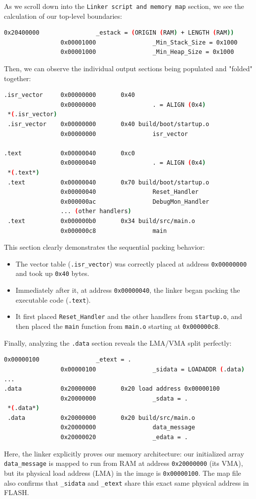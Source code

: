 As we scroll down into the \texttt{Linker script and memory map} section, we see the calculation of our top-level boundaries:
\begin{lstlisting}[language=bash]
                0x20400000                _estack = (ORIGIN (RAM) + LENGTH (RAM))
                0x00001000                _Min_Stack_Size = 0x1000
                0x00001000                _Min_Heap_Size = 0x1000
\end{lstlisting}

Then, we can observe the individual output sections being populated and "folded" together:

\begin{lstlisting}[language=bash]
.isr_vector     0x00000000       0x40
                0x00000000                . = ALIGN (0x4)
 *(.isr_vector)
 .isr_vector    0x00000000       0x40 build/boot/startup.o
                0x00000000                isr_vector

.text           0x00000040       0xc0
                0x00000040                . = ALIGN (0x4)
 *(.text*)
 .text          0x00000040       0x70 build/boot/startup.o
                0x00000040                Reset_Handler
                0x000000ac                DebugMon_Handler
                ... (other handlers)
 .text          0x000000b0       0x34 build/src/main.o
                0x000000c8                main
\end{lstlisting}
This section clearly demonstrates the sequential packing behavior: 
\begin{itemize}
    \item The vector table (\texttt{.isr\_vector}) was correctly placed at address \texttt{0x00000000} and took up \texttt{0x40} bytes.
    \item Immediately after it, at address \texttt{0x00000040}, the linker began packing the executable code (\texttt{.text}). 
    \item It first placed \texttt{Reset\_Handler} and the other handlers from \texttt{startup.o}, and then placed the \texttt{main} function from \texttt{main.o} starting at \texttt{0x000000c8}.
\end{itemize}

Finally, analyzing the \texttt{.data} section reveals the LMA/VMA split perfectly:
\begin{lstlisting}[language=bash]
                0x00000100                _etext = .
                0x00000100                _sidata = LOADADDR (.data)
...
.data           0x20000000       0x20 load address 0x00000100
                0x20000000                _sdata = .
 *(.data*)
 .data          0x20000000       0x20 build/src/main.o
                0x20000000                data_message
                0x20000020                _edata = .
\end{lstlisting}
Here, the linker explicitly proves our memory architecture: our initialized array \texttt{data\_message} is mapped to run from RAM at address \texttt{0x20000000} (its VMA), but its physical load address (LMA) in the image is \texttt{0x00000100}. The map file also confirms that \texttt{\_sidata} and \texttt{\_etext} share this exact same physical address in FLASH.


